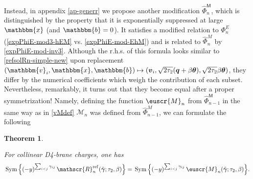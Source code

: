 \documentclass[12pt,letterpaper]{JHEP3}
\def\be{\begin{equation}}
\def\ee{\end{equation}}
\newtheorem{theorem}{Theorem}%
\def\Sym{\,{\rm Sym}\, }
\newcommand{\xbbm}{\mathbbm{x}}
\newcommand{\vbbm}{\mathbbm{v}}
\newcommand{\bbbm}{\mathbbm{b}}
\newcommand{\Msf}{\mathsf{M}}
\def\scR{\mathscr{R}}
\def\Mv{\mathscr{M}}
\def\euM{\euscr{M}}
\newcommand{\bfv}{{\boldsymbol v}}
\newcommand{\bfq}{{\boldsymbol q}}
\newcommand{\bftet}{{\boldsymbol \theta}}
\newcommand{\bfgam}{{\boldsymbol \gamma}}
\def\hPhi{\hat\Phi}
\def\bfhgam{\hat\bfgam}
\def\scRrf{\scR^{\rm ref}}
\begin{document}
Instead, in appendix \ref{ap-generr} we propose another modification $\hPhi_n^\Msf$, which is distinguished by the property that
it is exponentially suppressed at large $\xbbm$ (and $\bbbm=0$).
It satisfies a modified relation to $\Phi^E_n$ (\eqref{expPhiE-mod3-hEM} vs. \eqref{expPhiE-mod-EhM})
and is related to $\hPhi_n^M$ by \eqref{expPhiE-mod-inv3}.
Although the r.h.s. of this formula looks similar to \eqref{refsolRn-simple-new} upon replacement 
$(\vbbm_i,\xbbm,\bbbm)\mapsto(\bfv_i,\sqrt{2\tau_2}(\bfq+\beta\bftet),\sqrt{2\tau_2}\beta\bftet)$,
they differ by the numerical coefficients which weigh the contribution of each subset.
Nevertheless, remarkably, it turns out that they become equal after a proper symmetrization!
Namely, defining the function $\euM_n$ from $\hPhi^\Msf_{n-1}$ in the same way as in \eqref{vMdef} $\Mv_n$ was defined from $\hPhi^M_{n-1}$, 
we can formulate the following
\begingroup
\renewcommand{\thetheorem}{1b}
\begin{theorem}
\label{thm-simple-ref2}
\addtocounter{theorem}{-1}
For collinear D4-brane charges, one has
\be
\Sym \Bigl\{ (-y)^{\sum_{i<j} \gamma_{ij}}\, \scRrf_n(\bfhgam;\tau_2,\beta)
\Bigr\}=
\Sym \Bigl\{ (-y)^{\sum_{i<j} \gamma_{ij}}\,\euM_n(\bfhgam;\tau_2,\beta)
\Bigr\}.
\label{Rn-simple-new}
\ee
\end{theorem} 
\endgroup
\end{document}

